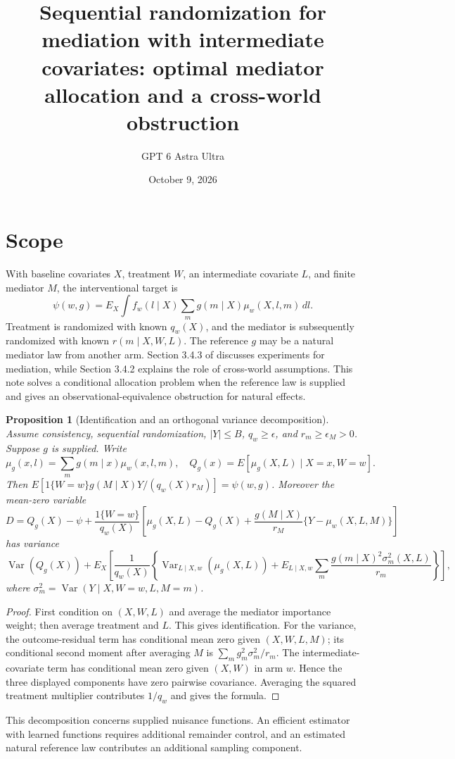 \documentclass[11pt]{article}
\title{Sequential randomization for mediation with intermediate covariates: optimal mediator allocation and a cross-world obstruction}
\author{GPT 6 Astra Ultra}
\date{October 9, 2026}
\newtheorem{proposition}[theorem]{Proposition}
\theoremstyle{remark}
\begin{document}
\maketitle

\section*{Scope}
With baseline covariates $X$, treatment $W$, an intermediate covariate $L$, and finite mediator $M$, the interventional target is
\[
 \psi(w,g)=E_X\int f_w(l\mid X)\sum_m g(m\mid X)\mu_w(X,l,m)\,dl.
\]
Treatment is randomized with known $q_w(X)$, and the mediator is subsequently randomized with known $r(m\mid X,W,L)$. The reference $g$ may be a natural mediator law from another arm. Section 3.4.3 of \cite{agenda} discusses experiments for mediation, while Section 3.4.2 explains the role of cross-world assumptions. This note solves a conditional allocation problem when the reference law is supplied and gives an observational-equivalence obstruction for natural effects.

\begin{proposition}[Identification and an orthogonal variance decomposition]
Assume consistency, sequential randomization, $|Y|\le B$, $q_w\ge\epsilon$, and $r_m\ge\epsilon_M>0$. Suppose $g$ is supplied. Write
\[
 \mu_g(x,l)=\sum_mg(m\mid x)\mu_w(x,l,m),\quad
 Q_g(x)=E[\mu_g(X,L)\mid X=x,W=w].
\]
Then $E[1\{W=w\}g(M\mid X)Y/(q_w(X)r_M)]=\psi(w,g)$. Moreover the mean-zero variable
\[
 D=Q_g(X)-\psi+\frac{1\{W=w\}}{q_w(X)}
 \left[\mu_g(X,L)-Q_g(X)+\frac{g(M\mid X)}{r_M}\{Y-\mu_w(X,L,M)\}\right]
\]
has variance
\[
 \operatorname{Var}(Q_g(X))+E_X\left[\frac1{q_w(X)}
 \left\{\operatorname{Var}_{L\mid X,w}(\mu_g(X,L))+
 E_{L\mid X,w}\sum_m\frac{g(m\mid X)^2\sigma_m^2(X,L)}{r_m}\right\}\right],
\]
where $\sigma_m^2=\operatorname{Var}(Y\mid X,W=w,L,M=m)$.
\end{proposition}
\begin{proof}
First condition on $(X,W,L)$ and average the mediator importance weight; then average treatment and $L$. This gives identification. For the variance, the outcome-residual term has conditional mean zero given $(X,W,L,M)$; its conditional second moment after averaging $M$ is $\sum_mg_m^2\sigma_m^2/r_m$. The intermediate-covariate term has conditional mean zero given $(X,W)$ in arm $w$. Hence the three displayed components have zero pairwise covariance. Averaging the squared treatment multiplier contributes $1/q_w$ and gives the formula.
\end{proof}
This decomposition concerns supplied nuisance functions. An efficient estimator with learned functions requires additional remainder control, and an estimated natural reference law contributes an additional sampling component.
\end{document}
